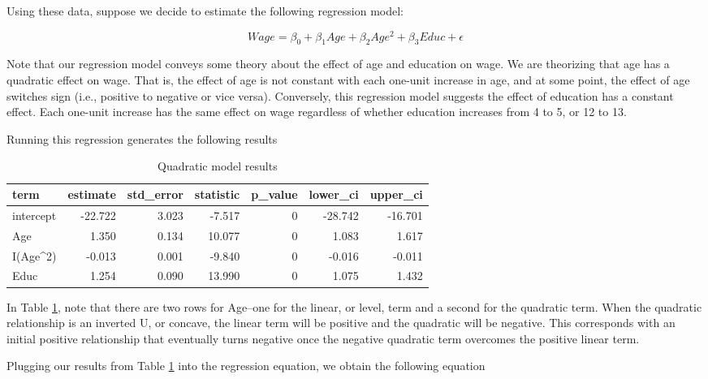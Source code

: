 \documentclass[
]{book}
\begin{document}
Using these data, suppose we decide to estimate the following regression model:

\begin{equation}
Wage = \beta_0 + \beta_1Age + \beta_2Age^2 + \beta_3Educ + \epsilon
\label{eq:quadraticex}
\end{equation}

Note that our regression model conveys some theory about the effect of age and education on wage. We are theorizing that age has a quadratic effect on wage. That is, the effect of age is not constant with each one-unit increase in age, and at some point, the effect of age switches sign (i.e., positive to negative or vice versa). Conversely, this regression model suggests the effect of education has a constant effect. Each one-unit increase has the same effect on wage regardless of whether education increases from 4 to 5, or 12 to 13.

Running this regression generates the following results

\begin{table}

\caption{\label{tab:quadextab}Quadratic model results}
\centering
\begin{tabular}[t]{l|r|r|r|r|r|r}
\hline
term & estimate & std\_error & statistic & p\_value & lower\_ci & upper\_ci\\
\hline
intercept & -22.722 & 3.023 & -7.517 & 0 & -28.742 & -16.701\\
\hline
Age & 1.350 & 0.134 & 10.077 & 0 & 1.083 & 1.617\\
\hline
I(Age\textasciicircum{}2) & -0.013 & 0.001 & -9.840 & 0 & -0.016 & -0.011\\
\hline
Educ & 1.254 & 0.090 & 13.990 & 0 & 1.075 & 1.432\\
\hline
\end{tabular}
\end{table}

In Table \ref{tab:quadextab}, note that there are two rows for Age--one for the linear, or level, term and a second for the quadratic term. When the quadratic relationship is an inverted U, or concave, the linear term will be positive and the quadratic will be negative. This corresponds with an initial positive relationship that eventually turns negative once the negative quadratic term overcomes the positive linear term.

Plugging our results from Table \ref{tab:quadextab} into the regression equation, we obtain the following equation
\end{document}
